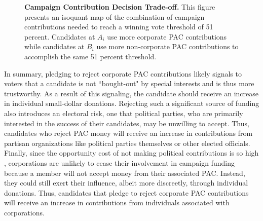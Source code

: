 \documentclass[12pt]{article}
\begin{document}
\begin{figure}[!htb]
\centering
{}
\caption{\textbf{Campaign Contribution Decision Trade-off.} This figure presents an isoquant map of the combination of campaign contributions needed to reach a winning vote threshold of 51 percent. Candidates at $A_i$ use more corporate PAC contributions while candidates at $B_i$ use more non-corporate PAC contributions to accomplish the same 51 percent threshold.}
\label{fig: iso map}
\end{figure}
 
 In summary, pledging to reject corporate PAC contributions likely signals to voters that a candidate is not ``bought-out" by special interests and is thus more trustworthy. As a result of this signaling, the candidate should receive an increase in individual small-dollar donations. Rejecting such a significant source of funding also introduces an electoral risk, one that political parties, who are primarily interested in the success of their candidates, may be unwilling to accept. Thus, candidates who reject PAC money will receive an increase in contributions from partisan organizations like political parties themselves or other elected officials. Finally, since the opportunity cost of not making political contributions is so high \citep{grier1991}, corporations are unlikely to cease their involvement in campaign funding because a member will not accept money from their associated PAC. Instead, they could still exert their influence, albeit more discreetly, through individual donations. Thus, candidates that pledge to reject corporate PAC contributions will receive an increase in contributions from individuals associated with corporations.
\end{document}
